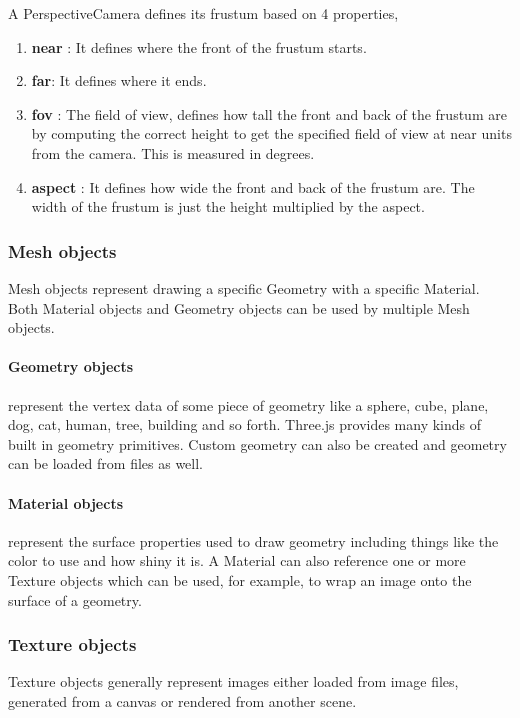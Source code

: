 \documentclass{article}
\begin{document}
A PerspectiveCamera defines its frustum based on 4 properties, 
    \begin{enumerate}
    \item \textbf{near} : It defines where the front of the frustum starts.
    \item \textbf{far}: It defines where it ends.
    \item \textbf{fov} : The field of view, defines how tall the front and back of the frustum are by computing the correct height to get the specified field of view at near units from the camera. This is measured in degrees.
    \item \textbf{aspect} : It defines how wide the front and back of the frustum are. The width of the frustum is just the height multiplied by the aspect.
    
    \end{enumerate}
    
    
    \subsubsection{Mesh objects}
    Mesh objects represent drawing a specific Geometry with a specific Material. Both Material objects and Geometry objects can be used by multiple Mesh objects. 
    \paragraph{Geometry objects} represent the vertex data of some piece of geometry like a sphere, cube, plane, dog, cat, human, tree, building and so forth. Three.js provides many kinds of built in geometry primitives. Custom geometry can also be created and geometry can be loaded from files as well.
    
    \paragraph{Material objects} represent the surface properties used to draw geometry including things like the color to use and how shiny it is. A Material can also reference one or more Texture objects which can be used, for example, to wrap an image onto the surface of a geometry.
    
    \subsubsection{Texture objects}
    Texture objects generally represent images either loaded from image files, generated from a canvas or rendered from another scene.
\end{document}
